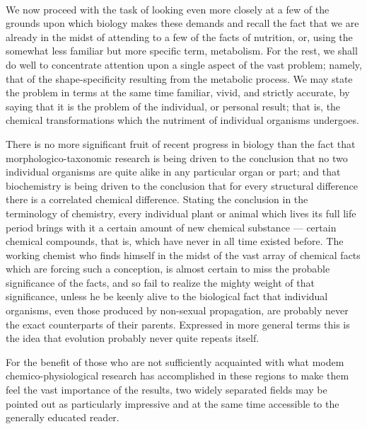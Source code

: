 \documentclass[a4paper, 11pt, oneside, polutonikogreek, english, landscape]{article}
\begin{document}
\paragraph{}
We now proceed with the task of looking even more closely at a few of the grounds upon which biology makes these demands and recall the fact that we are already in the midst of attending to a few of the facts of nutrition, or, using the somewhat less familiar but more specific term, metabolism. For the rest, we shall do well to concentrate attention upon a single aspect of the vast problem; namely, that of the shape-specificity resulting from the metabolic process. We may state the problem in terms at the same time familiar, vivid, and strictly accurate, by saying that it is the problem of the individual, or personal result; that is, the chemical transformations which the nutriment of individual organisms undergoes.

There is no more significant fruit of recent progress in biology than the fact that morphologico-taxonomic research is being driven to the conclusion that no two individual organisms are quite alike in any particular organ or part; and that biochemistry is being driven to the conclusion that for every structural difference there is a correlated chemical difference. Stating the conclusion in the terminology of chemistry, every individual plant or animal which lives its full life period brings with it a certain amount of new chemical substance --- certain chemical compounds, that is, which have never in all time existed before. The working chemist who finds himself in the midst of the vast array of chemical facts which are forcing such a conception, is almost certain to miss the probable significance of the facts, and so fail to realize the mighty weight of that significance, unless he be keenly alive to the biological fact that individual organisms, even those produced by non-sexual propagation, are probably never the exact counterparts of their parents. Expressed in more general terms this is the idea that evolution probably never quite repeats itself.

For the benefit of those who are not sufficiently acquainted with what modem chemico-physiological research has accomplished in these regions to make them feel the vast importance of the results, two widely separated fields may be pointed out as particularly impressive and at the same time accessible to the generally educated reader.
\end{document}
